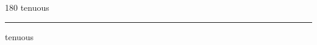 
\begin{frame}
\begin{center}
\begin{turn}{180}
{\fontsize{2.5cm}{1em}\selectfont tenuous}
\end{turn}
\vspace{1em}\par  
\hrule
\vspace{1em}\par  
{\fontsize{2.5cm}{1em}\selectfont tenuous}
\end{center}
\end{frame}
